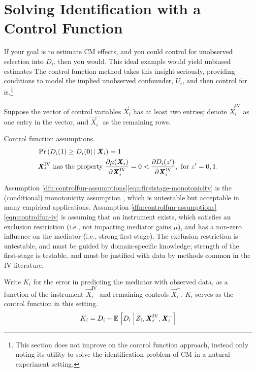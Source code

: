 \section{Solving Identification with a Control Function}
\label{sec:controlfun}
If your goal is to estimate CM effects, and you could control for unobserved selection into $D_i$, then you would.
This ideal example would yield unbiased estimates
The control function method takes this insight seriously, providing conditions to model the implied unobserved confounder, $U_i$, and then control for it.\footnote{
    This section does not improve on the control function approach, instead only noting its utility to solve the identification problem of CM in a natural experiment setting.
}

Suppose the vector of control variables $\vec X_i$ has at least two entries;
denote $\vec X_i^{\text{IV}}$ as one entry in the vector, and $\vec X_i^-$ as the remaining rows.

\begin{definition}
    \label{dfn:controlfun-assumptions}
    Control function assumptions.
    \begin{align}
        \label{eqn:firststage-monotonicity}
        &\Probgiven{ D_i(1) \geq D_i(0) }{\vec X_i} = 1    \\
        \label{eqn:controlfun-iv}
        &\vec X_i^{\text{IV}} \text{ has the property }
        \partialdiff[\mu(\vec X_i)]{\vec X_i^{\text{IV}}} = 0 < \partialdiff[D_i(z')]{\vec X_i^{\text{IV}}}, \textnormal{ for } z' = 0, 1.
    \end{align}
\end{definition}
Assumption \ref{dfn:controlfun-assumptions}\eqref{eqn:firststage-monotonicity} is the (conditional) monotonicity assumption \citep{imbens1994identification}, which is untestable but acceptable in many empirical applications.
Assumption \ref{dfn:controlfun-assumptions}\eqref{eqn:controlfun-iv} is assuming that an instrument exists, which satisfies an exclusion restriction (i.e., not impacting mediator gains $\mu$), and has a non-zero influence on the mediator (i.e., strong first-stage).
The exclusion restriction is untestable, and must be guided by domain-specific knowledge; strength of the first-stage is testable, and must be justified with data by methods common in the IV literature.

Write $K_i$ for the error in predicting the mediator with observed data, as a function of the instrument $\vec X_i^{\text{IV}}$ and remaining controls $\vec X_i^-$.
$K_i$ serves as the control function in this setting.
\[ K_i = D_i - \mathbb{E}_{} \left[ D_i \, \middle\vert \, Z_i, \boldsymbol{\mathit{X}}_i^{\text{IV}}, \boldsymbol{\mathit{X}}_i^- \right] \]

